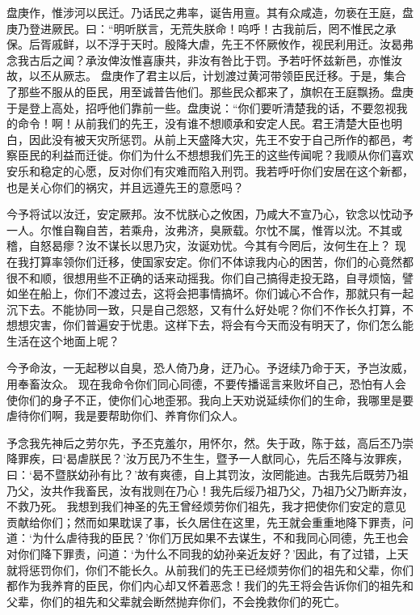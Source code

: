 \documentclass[12pt,UTF8]{ctexbook}
\begin{document}
盘庚作，惟涉河以民迁。乃话民之弗率，诞告用亶。其有众咸造，勿亵在王庭，盘庚乃登进厥民。曰：“明听朕言，无荒失朕命！呜呼！古我前后，罔不惟民之承保。后胥戚鲜，以不浮于天时。殷降大虐，先王不怀厥攸作，视民利用迁。汝曷弗念我古后之闻？承汝俾汝惟喜康共，非汝有咎比于罚。予若吁怀兹新邑，亦惟汝故，以丕从厥志。
盘庚作了君主以后，计划渡过黄河带领臣民迁移。于是，集合了那些不服从的臣民，用至诚普告他们。那些民众都来了，旗帜在王庭飘扬。盘庚于是登上高处，招呼他们靠前一些。盘庚说：“你们要听清楚我的话，不要忽视我的命令！啊！从前我们的先王，没有谁不想顺承和安定人民。君王清楚大臣也明白，因此没有被天灾所惩罚。从前上天盛降大灾，先王不安于自己所作的都邑，考察臣民的利益而迁徙。你们为什么不想想我们先王的这些传闻呢？我顺从你们喜欢安乐和稳定的心愿，反对你们有灾难而陷入刑罚。我若呼吁你们安居在这个新都，也是关心你们的祸灾，并且远遵先王的意愿吗？

今予将试以汝迁，安定厥邦。汝不忧朕心之攸困，乃咸大不宣乃心，钦念以忱动予一人。尔惟自鞠自苦，若乘舟，汝弗济，臭厥载。尔忱不属，惟胥以沈。不其或稽，自怒曷瘳？汝不谋长以思乃灾，汝诞劝忧。今其有今罔后，汝何生在上？
现在我打算率领你们迁移，使国家安定。你们不体谅我内心的困苦，你们的心竟然都很不和顺，很想用些不正确的话来动摇我。你们自己搞得走投无路，自寻烦恼，譬如坐在船上，你们不渡过去，这将会把事情搞坏。你们诚心不合作，那就只有一起沉下去。不能协同一致，只是自己怨怒，又有什么好处呢？你们不作长久打算，不想想灾害，你们普遍安于忧患。这样下去，将会有今天而没有明天了，你们怎么能生活在这个地面上呢？

今予命汝，一无起秽以自臭，恐人倚乃身，迂乃心。予迓续乃命于天，予岂汝威，用奉畜汝众。
现在我命令你们同心同德，不要传播谣言来败坏自己，恐怕有人会使你们的身子不正，使你们心地歪邪。我向上天劝说延续你们的生命，我哪里是要虐待你们啊，我是要帮助你们、养育你们众人。

予念我先神后之劳尔先，予丕克羞尔，用怀尔，然。失于政，陈于兹，高后丕乃崇降罪疾，曰‘曷虐朕民？’汝万民乃不生生，暨予一人猷同心，先后丕降与汝罪疾，曰：‘曷不暨朕幼孙有比？’故有爽德，自上其罚汝，汝罔能迪。古我先后既劳乃祖乃父，汝共作我畜民，汝有戕则在乃心！我先后绥乃祖乃父，乃祖乃父乃断弃汝，不救乃死。
我想到我们神圣的先王曾经烦劳你们祖先，我才把使你们安定的意见贡献给你们；然而如果耽误了事，长久居住在这里，先王就会重重地降下罪责，问道：‘为什么虐待我的臣民？’你们万民如果不去谋生，不和我同心同德，先王也会对你们降下罪责，问道：‘为什么不同我的幼孙亲近友好？’因此，有了过错，上天就将惩罚你们，你们不能长久。从前我们的先王已经烦劳你们的祖先和父辈，你们都作为我养育的臣民，你们内心却又怀着恶念！我们的先王将会告诉你们的祖先和父辈，你们的祖先和父辈就会断然抛弃你们，不会挽救你们的死亡。
\end{document}
